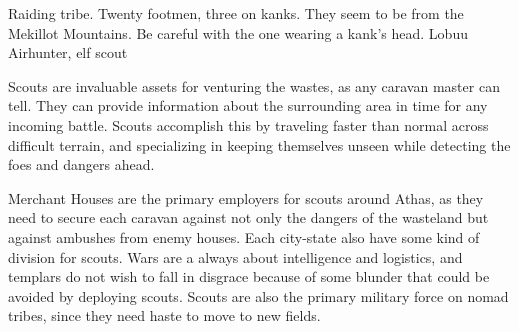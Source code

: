 {Raiding tribe. Twenty footmen, three on kanks. They seem to be from the Mekillot Mountains. Be careful with the one wearing a kank's head.}
{Lobuu Airhunter, elf scout}

Scouts are invaluable assets for venturing the wastes, as any caravan master can tell. They can provide information about the surrounding area in time for any incoming battle. Scouts accomplish this by traveling faster than normal across difficult terrain, and specializing in keeping themselves unseen while detecting the foes and dangers ahead.

Merchant Houses are the primary employers for scouts around Athas, as they need to secure each caravan against not only the dangers of the wasteland but against ambushes from enemy houses. Each city-state also have some kind of division for scouts. Wars are a always about intelligence and logistics, and templars do not wish to fall in disgrace because of some blunder that could be avoided by deploying scouts. Scouts are also the primary military force on nomad tribes, since they need haste to move to new fields.

